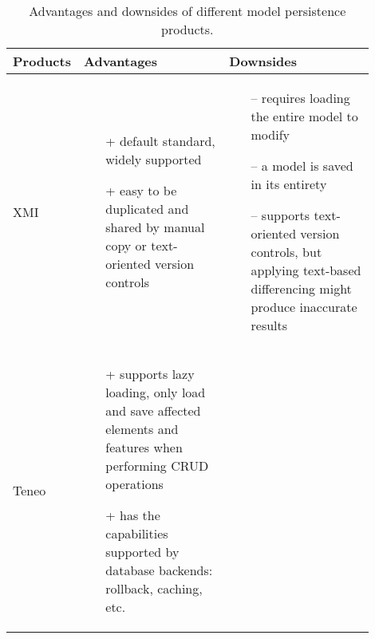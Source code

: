 \begin{table*}[]
  \centering
  \caption{Advantages and downsides of different model persistence products.}
  \label{table:model_persistence_comparison}
\begin{scriptsize}
  \begin{tabular}{
      |>{\centering\arraybackslash}m{0.1\linewidth}
      |>{\centering\arraybackslash}m{0.4\linewidth}
      |>{\centering\arraybackslash}m{0.4\linewidth}
      |}
    \hline
    \textbf{Products} & \textbf{Advantages} & \textbf{Downsides} \\
    \hline
    XMI 
    &
    \begin{minipage}[t]{\linewidth}
      \raggedright
      \begin{itemize}[leftmargin=7pt]
        \setlength
        \item[+] default standard, widely supported
        \item[+] easy to be duplicated and shared by manual copy or text-oriented version controls
      \end{itemize}
    \end{minipage}
    & 
    \begin{minipage}[t]{\linewidth}
      \raggedright
      \begin{itemize}[leftmargin=5pt]
        \setlength
        \item[--] requires loading the entire model to modify
        \item[--] a model is saved in its entirety
        \item[--] supports text-oriented version controls, but applying text-based differencing might produce inaccurate results    
      \end{itemize}
    \end{minipage}
    \\
    \hline
    Teneo 
    & 
    \begin{minipage}[t]{\linewidth}
      \raggedright
      \begin{itemize}[leftmargin=7pt]
        \setlength
        \item[+] supports lazy loading, only load and save affected elements and features when performing CRUD operations
        \item[+] has the capabilities supported by database backends: rollback, caching, etc. 
      \end{itemize}
    \end{minipage}
    &
    \begin{minipage}[t]{\linewidth}

\end{minipage}
\end{tabular}
\end{scriptsize}
\end{table*}
